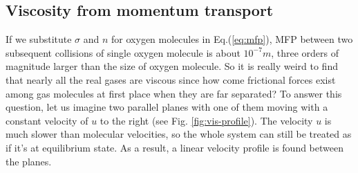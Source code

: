 \subsection{Viscosity from momentum transport}
If we substitute $ \sigma $ and $ n $ for oxygen molecules in Eq.(\ref{eq:mfp}), MFP between two subsequent collisions of single oxygen molecule is about $ 10^{-7}m $, three orders of magnitude larger than the size of oxygen molecule. So it is really weird to find that nearly all the real gases are viscous since how come frictional forces exist among gas molecules at first place when they are far separated? To answer this question, let us imagine two parallel planes with one of them moving with a constant velocity of $ u $ to the right (see Fig. \ref{fig:vis-profile}). The velocity $ u $ is much slower than molecular velocities, so the whole system can still be treated as if it's at equilibrium state. As a result, a linear velocity profile is found between the planes. 
